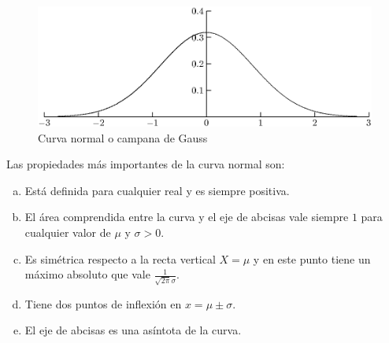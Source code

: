 \documentclass[12pt]{report}
\begin{document}
\begin{figure}
\begin{center}
\includegraphics{curva.eps}
\end{center} \caption{Curva normal o campana de Gauss} \label{NORMAL}
\end{figure}

Las propiedades más importantes de la curva normal son:
\begin{enumerate}[a)]
\item Está definida para cualquier real  y es siempre positiva.
\item El área comprendida entre  la curva y el eje de abcisas
vale siempre $1$ para cualquier valor de $\mu$ y $\sigma>0$.
\item Es simétrica respecto a la recta vertical $X=\mu$ y en este punto
tiene un máximo absoluto que vale $\frac{1}{\sqrt{2 \pi} \sigma}$.
\item Tiene dos puntos de inflexión en $x=\mu \pm \sigma$.
\item El eje de abcisas es una asíntota de la curva.
\end{enumerate}
\end{document}
